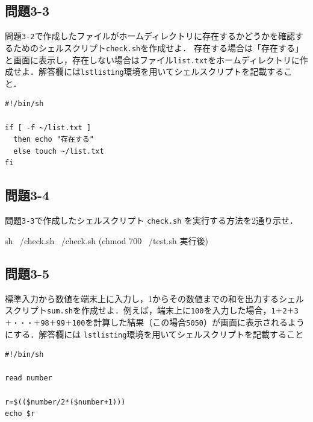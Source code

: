 \documentclass[10pt,dvipdfmx]{jsarticle}
\newcommand{\answer}[1]{\begin{flushleft}
            \framebox{\large\bf #1}\end{flushleft}}
\newcommand{\氏名}{神野　友哉}  %
\newcommand{\学籍番号}{2022311042}  %
\begin{document}
\subsection*{問題3-3}
問題\texttt{3-2}で作成したファイルがホームディレクトリに存在するかどうかを確認するためのシェルスクリプト\texttt{check.sh}を作成せよ．
存在する場合は「存在する」と画面に表示し，存在しない場合はファイル\texttt{list.txt}をホームディレクトリに作成せよ．解答欄には\texttt{lstlisting}環境を用いてシェルスクリプトを記載すること．
\answer{解答3-3}
\begin{lstlisting}
#!/bin/sh

if [ -f ~/list.txt ] 
  then echo "存在する"
  else touch ~/list.txt
fi

\end{lstlisting}
\subsection*{問題3-4}
問題\texttt{3-3}で作成したシェルスクリプト \texttt{check.sh} を実行する方法を2通り示せ．
\answer{解答3-4}
sh ~/check.sh
~/check.sh (chmod 700 ~/test.sh 実行後)
\subsection*{問題3-5}
標準入力から数値を端末上に入力し，1からその数値までの和を出力するシェルスクリプト\texttt{sum.sh}を作成せよ．例えば，端末上に\texttt{100}を入力した場合，\texttt{1＋2＋3＋・・・＋98＋99＋100}を計算した結果（この場合\texttt{5050}）が画面に表示されるようにする．解答欄には \texttt{lstlisting}環境を用いてシェルスクリプトを記載すること
\answer{解答3-5}
\begin{lstlisting}
#!/bin/sh

read number

r=$(($number/2*($number+1)))
echo $r

\end{lstlisting}
\newpage
%
%
\end{document}
